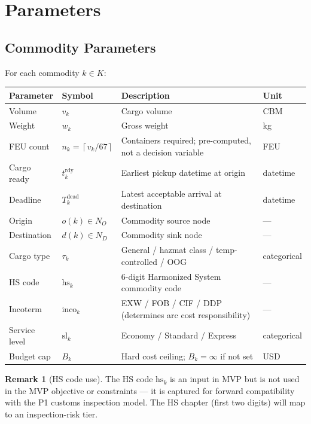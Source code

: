 \documentclass[11pt,a4paper]{article}
\newcommand{\ceil}[1]{\left\lceil #1 \right\rceil}
\theoremstyle{definition}
\newtheorem{remark}{Remark}
\begin{document}
\section{Parameters}

\subsection{Commodity Parameters}

For each commodity $k \in K$:

\begin{center}
\begin{tabular}{llp{6cm}l}
\toprule
Parameter & Symbol & Description & Unit \\
\midrule
Volume & $v_k$ & Cargo volume & CBM \\
Weight & $w_k$ & Gross weight & kg \\
FEU count & $n_k = \ceil{v_k / 67}$ & Containers required; pre-computed, not a decision variable & FEU \\
Cargo ready & $t_k^{\text{rdy}}$ & Earliest pickup datetime at origin & datetime \\
Deadline & $T_k^{\text{dead}}$ & Latest acceptable arrival at destination & datetime \\
Origin & $o(k) \in N_O$ & Commodity source node & --- \\
Destination & $d(k) \in N_D$ & Commodity sink node & --- \\
Cargo type & $\tau_k$ & General / hazmat class / temp-controlled / OOG & categorical \\
HS code & $\text{hs}_k$ & 6-digit Harmonized System commodity code & --- \\
Incoterm & $\text{inco}_k$ & EXW / FOB / CIF / DDP (determines arc cost responsibility) & --- \\
Service level & $\text{sl}_k$ & Economy / Standard / Express & categorical \\
Budget cap & $B_k$ & Hard cost ceiling; $B_k = \infty$ if not set & USD \\
\bottomrule
\end{tabular}
\end{center}

\begin{remark}[HS code use]
The HS code $\text{hs}_k$ is an input in MVP but is not used in the MVP objective or
constraints --- it is captured for forward compatibility with the P1 customs inspection
model. The HS chapter (first two digits) will map to an inspection-risk tier.
\end{remark}
\end{document}
